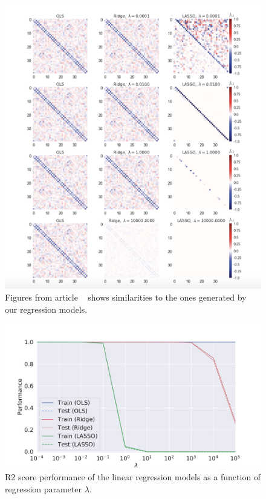 \begin{figure}[H]
\includegraphics[width = 0.7\paperwidth]{figures/Regression_metha_article.png} 
\caption{Figures from article ~\cite{HighBias} shows similarities to the ones generated by our regression models.} 
\label{fig:regression-mehta-article}
\end{figure}


\begin{figure}[H]
\includegraphics[width = 0.8\paperwidth]{figures/regression_r2.pdf}
    \caption{R2 score performance of the linear regression models as a function of
	     regression parameter $\lambda$.}
\label{fig:regression-r2}
\end{figure}

